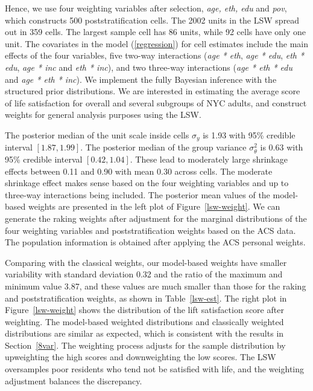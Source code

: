 \documentclass[11pt]{article}
\numberwithin{figure}{section}
\numberwithin{table}{section}
\numberwithin{equation}{section}
\begin{document}
Hence, we use four weighting variables after selection, {\em age, eth, edu} and
{\em pov}, which constructs 500 poststratification cells. The 2002 units in the
LSW spread out in 359 cells. The largest sample cell has 86 units, while 92
cells have only one unit. The covariates in the model (\ref{regression}) for
cell estimates include the main effects of the four variables, five two-way
interactions ({\em age * eth}, {\em age * edu}, {\em eth * edu}, {\em age *
inc} and {\em eth * inc}), and two three-way interactions ({\em age * eth *
edu} and {\em age * eth * inc}). We implement the fully Bayesian inference with
the structured prior distributions. We are interested in estimating the average
score of life satisfaction for overall and several subgroups of NYC adults, and
construct weights for general analysis purposes using the LSW. 

The posterior median of the unit scale inside cells $\sigma_y$ is 1.93 with
95\% credible interval $[1.87,1.99]$. The posterior median of the group
variance $\sigma_{\theta}^2$ is 0.63 with 95\% credible interval $[0.42,
1.04]$. These lead to moderately large shrinkage effects between 0.11 and 0.90
with mean 0.30 across cells. The moderate shrinkage effect makes sense based on
the four weighting variables and up to three-way interactions being included.
The posterior mean values of the model-based weights are presented in the left
plot of Figure~\ref{lsw-weight}. We can generate the raking weights after
adjustment for the marginal distributions of the four weighting variables and
poststratification weights based on the ACS data. The population information is
obtained after applying the ACS personal weights.

Comparing with the classical weights, our model-based weights have smaller
variability with standard deviation 0.32 and the ratio of the maximum and
minimum value 3.87, and these values are much smaller than those for the raking
and poststratification weights, as shown in Table~\ref{lsw-est}. The right plot
in Figure~\ref{lsw-weight} shows the distribution of the lift satisfaction
score after weighting. The model-based weighted distributions and classically
weighted distributions are similar as expected, which is consistent with the
results in Section~\ref{8var}. The weighting process adjusts for the sample
distribution by upweighting the high scores and downweighting the low scores.
The LSW oversamples poor residents who tend not be satisfied with life, and the
weighting adjustment balances the discrepancy.
\end{document}
